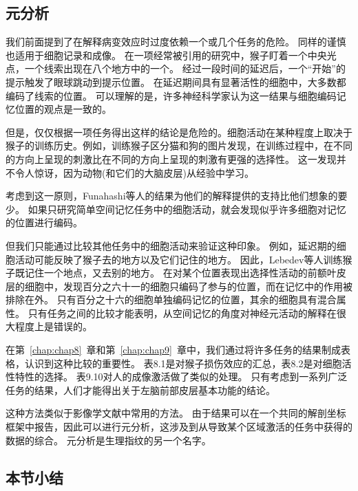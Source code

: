 \subsection{元分析}

我们前面提到了在解释病变效应时过度依赖一个或几个任务的危险。
同样的谨慎也适用于细胞记录和成像。
在一项经常被引用的研究中\cite{funahashi1989mnemonic}，猴子盯着一个中央光点，一个线索出现在八个地方中的一个。
经过一段时间的延迟后，一个“开始”的提示触发了眼球跳动到提示位置。
在延迟期间具有显著活性的细胞中，大多数都编码了线索的位置。
可以理解的是，许多神经科学家认为这一结果与细胞编码记忆位置的观点是一致的。


\par
但是，仅仅根据一项任务得出这样的结论是危险的。细胞活动在某种程度上取决于猴子的训练历史。例如，训练猴子区分猫和狗的图片发现\cite{freedman2006experience}，在训练过程中，在不同的方向上呈现的刺激比在不同的方向上呈现的刺激有更强的选择性。
这一发现并不令人惊讶，因为动物(和它们的大脑皮层)从经验中学习。


\par
考虑到这一原则，Funahashi等人\cite{funahashi1989mnemonic}的结果为他们的解释提供的支持比他们想象的要少。
如果只研究简单空间记忆任务中的细胞活动，就会发现似乎许多细胞对记忆的位置进行编码。


\par
但我们只能通过比较其他任务中的细胞活动来验证这种印象。
例如，延迟期的细胞活动可能反映了猴子去的地方以及它们记住的地方。
因此，Lebedev等人\cite{lebedev2004representation}训练猴子既记住一个地点，又去别的地方。
在对某个位置表现出选择性活动的前额叶皮层的细胞中，发现百分之六十一的细胞只编码了参与的位置，而在记忆中的作用被排除在外。
只有百分之十六的细胞单独编码记忆的位置，其余的细胞具有混合属性。
只有任务之间的比较才能表明，从空间记忆的角度对神经元活动的解释在很大程度上是错误的。


\par
在第~\ref{chap:chap8}~章和第~\ref{chap:chap9}~章中，我们通过将许多任务的结果制成表格，认识到这种比较的重要性。
表8.1是对猴子损伤效应的汇总，表8.2是对细胞活性特性的选择。
表9.10对人的成像激活做了类似的处理。
只有考虑到一系列广泛任务的结果，人们才能得出关于左脑前部皮层基本功能的结论。


\par
这种方法类似于影像学文献中常用的方法。
由于结果可以在一个共同的解剖坐标框架中报告，因此可以进行元分析，这涉及到从导致某个区域激活的任务中获得的数据的综合。
元分析是生理指纹的另一个名字。


\subsection{本节小结}

